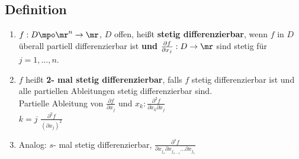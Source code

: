 \subsection{Definition}
	\begin{enumerate}
		\item $ f: D\mpo\mr^n\rightarrow\mr $, $ D $ offen, heißt \textbf{stetig differenzierbar}, wenn $ f $ in $ D $ überall partiell differenzierbar ist \textbf{und} $ \frac{\partial f}{\partial x_j}:D\rightarrow\mr $ sind stetig für $ j=1,...,n $.
		
		\item  $ f $ heißt \textbf{2- mal stetig differenzierbar}, falls $ f $ stetig differenzierbar ist und alle partiellen Ableitungen stetig differenzierbar sind.\\
		Partielle Ableitung von $ \frac{\partial f}{\partial x_j} $ und $ x_k:\frac{\partial^2 f}{\partial x_k\partial x_j} $\\
		$ k=j $ $ \frac{\partial^2 f}{(\partial x_j)^2} $
		
		\item Analog: $ s $- mal stetig differenzierbar, $ \frac{\partial^s f}{\partial x_{j_{s}}\partial x_{j_{s-1}}...\partial x_{j_{1}}} $
	\end{enumerate}